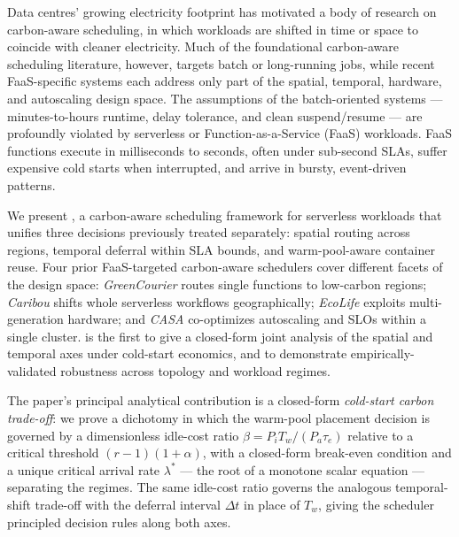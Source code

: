Data centres' growing electricity footprint has motivated a body of
research on carbon-aware scheduling, in which workloads are shifted in
time or space to coincide with cleaner electricity. Much of the
foundational carbon-aware scheduling literature, however, targets
batch or long-running jobs, while recent FaaS-specific systems each
address only part of the spatial, temporal, hardware, and autoscaling
design space. The assumptions of the batch-oriented systems
--- minutes-to-hours runtime, delay tolerance, and clean
suspend/resume --- are profoundly violated by serverless or
Function-as-a-Service (FaaS) workloads. FaaS functions execute in
milliseconds to seconds, often under sub-second SLAs, suffer
expensive cold starts when interrupted, and arrive in bursty,
event-driven patterns.

We present \GreenFaaS, a carbon-aware scheduling framework for
serverless workloads that unifies three decisions previously treated
separately: spatial routing across regions, temporal deferral within
SLA bounds, and warm-pool-aware container reuse. Four prior FaaS-targeted
carbon-aware schedulers cover different facets of the design space:
\emph{GreenCourier} \citep{chadha2023greencourier} routes single
functions to low-carbon regions; \emph{Caribou} \citep{gsteiger2024caribou}
shifts whole serverless workflows geographically; \emph{EcoLife}
\citep{jiang2024ecolife} exploits multi-generation hardware; and
\emph{CASA} \citep{qi2024casa} co-optimizes autoscaling and SLOs within
a single cluster. \GreenFaaS{} is the first to give a closed-form
joint analysis of the spatial and temporal axes under cold-start
economics, and to demonstrate empirically-validated robustness across topology and
workload regimes.

The paper's principal analytical contribution is a closed-form
\emph{cold-start carbon trade-off}: we prove a dichotomy in which the
warm-pool placement decision is governed by a dimensionless idle-cost
ratio $\beta = P_i T_w / (P_a \tau_e)$ relative to a critical
threshold $(r-1)(1+\alpha)$, with a closed-form break-even condition and a unique critical
arrival rate $\lambda^*$ --- the root of a monotone scalar equation
--- separating the regimes. The same idle-cost ratio governs
the analogous temporal-shift trade-off with the deferral interval
$\Delta t$ in place of $T_w$, giving the scheduler principled
decision rules along both axes.

